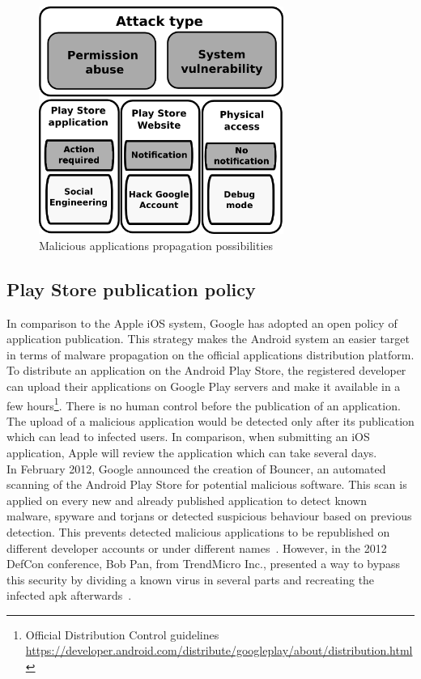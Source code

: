 \begin{figure}[h]
  \centering
  \includegraphics[width=8cm]{images/secu-graph.png}
  \caption{Malicious applications propagation possibilities}
  \label{fig:secu-graph}
\end{figure}

\subsection{Play Store publication policy}
\label{sec:playstore-publication-policy}

In comparison to the Apple iOS system, Google has adopted an open policy of application publication.
This strategy makes the Android system an easier target in terms of malware propagation on the official applications distribution platform.\\

To distribute an application on the Android Play Store, the registered developer can upload their applications on Google Play servers and make it available in a few hours\footnote{Official Distribution Control guidelines \url{https://developer.android.com/distribute/googleplay/about/distribution.html}}.
There is no human control before the publication of an application.
The upload of a malicious application would be detected only after its publication which can lead to infected users.
In comparison, when submitting an iOS application, Apple will review the application which can take several days.\\

In February 2012, Google announced the creation of Bouncer, an automated scanning of the Android Play Store for potential malicious software.
This scan is applied on every new and already published application to detect known malware, spyware and torjans or detected suspicious behaviour based on previous detection.
This prevents detected malicious applications to be republished on different developer accounts or under different names~\cite{secu-bouncer}.
However, in the 2012 DefCon conference, Bob Pan, from TrendMicro Inc., presented a way to bypass this security by dividing a known virus in several parts and recreating the infected apk afterwards~\cite{secu-defcon}.\\

